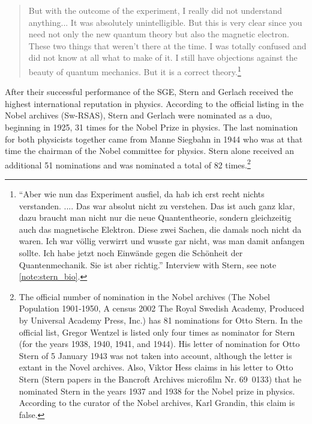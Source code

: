 \documentclass[12pt]{article}
\begin{document}
\begin{quote}
But with the outcome of the experiment, I really did not understand anything... It was absolutely unintelligible. But this is very clear since you need not only the new quantum theory but also the magnetic electron. These two things that weren't there at the time. I was totally confused and did not know at all what to make of it. I still have objections against the beauty of quantum mechanics. But it is a correct theory.\footnote{``Aber wie nun das Experiment ausfiel, da hab ich erst recht nichts verstanden. .... Das war absolut nicht zu verstehen. Das ist auch ganz klar, dazu braucht man nicht nur die neue Quantentheorie, sondern gleichzeitig auch das magnetische Elektron. Diese zwei Sachen, die damals noch nicht da waren. Ich war völlig verwirrt und wusste gar nicht, was man damit anfangen sollte. Ich habe jetzt noch Einwände gegen die Schönheit der Quantenmechanik. Sie ist aber richtig.'' Interview with Stern, see note \ref{note:stern_bio}.}
\end{quote}

After their successful performance of the SGE, Stern and Gerlach received the highest international reputation in physics. According to the official listing in the Nobel archives  (Sw-RSAS), Stern and Gerlach were nominated as a duo, beginning in 1925, 31 times for the Nobel Prize in physics. The last nomination for both physicists together came from Manne Siegbahn in 1944 who was at that time the chairman of the Nobel committee for physics.  Stern alone received an additional 51 nominations and was nominated a total of 82 times.\footnote{The official number of nomination in the Nobel archives (The Nobel Population 1901-1950, A census 2002 The Royal Swedish Academy, Produced by Universal Academy Press, Inc.) 
has 81 nominations for Otto Stern. In the official list, Gregor Wentzel is  listed only four times as nominator for Stern (for the years 1938, 1940, 1941, and 1944). His letter of nomination for Otto Stern of 5 January 1943 was not taken into account, although the letter is extant in the Novel archives. Also, Viktor Hess claims in his letter to Otto Stern (Stern papers in the Bancroft Archives microfilm Nr. 69~0133) that he nominated Stern in the years 1937 and 1938 for the Nobel prize in physics. According to the curator of the Nobel archives, Karl Grandin, this claim is false.}
\end{document}

